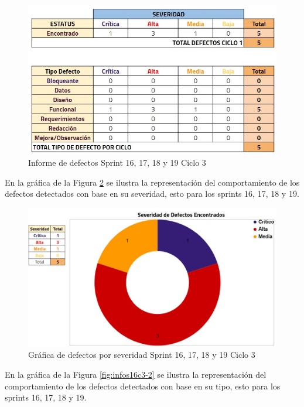 \begin{figure}[H]
	\begin{center}
		\includegraphics[width=.90\textwidth]{images/pruebas/s16c3}
		\caption{Informe de defectos Sprint 16, 17, 18 y 19  Ciclo 3}
		\label{fig:infos16c3}
	\end{center}
\end{figure}

En la gráfica de la Figura \ref{fig:infos16c3-1} se ilustra la representación del comportamiento de los defectos detectados con base en su severidad, esto para los sprints 16, 17, 18 y 19.

\begin{figure}[H]
	\begin{center}
		\includegraphics[width=.75\textwidth]{images/pruebas/s16c3-1}
		\caption{Gráfica de defectos por severidad Sprint 16, 17, 18 y 19  Ciclo 3}
		\label{fig:infos16c3-1}
	\end{center}
\end{figure}

En la gráfica de la Figura \ref{fig:infos16c3-2} se ilustra la representación del comportamiento de los defectos detectados con base en su tipo, esto para los sprints 16, 17, 18 y 19.

